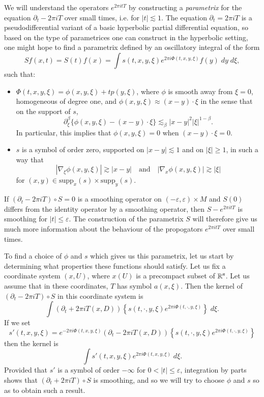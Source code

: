 We will understand the operators $e^{2 \pi i t T}$ by constructing a \emph{parametrix} for the equation $\partial_t - 2 \pi i T$ over small times, i.e. for $|t| \lesssim 1$. The equation $\partial_t = 2 \pi i T$ is a pseudodifferential variant of a basic hyperbolic partial differential equation, so based on the type of parametrices one can construct in the hyperbolic setting, one might hope to find a parametrix defined by an oscillatory integral of the form
%
\[ Sf(x,t) = S(t)f(x) = \int s(t,x,y,\xi) e^{2 \pi i \Phi(t,x,y,\xi)} f(y)\; dy\; d\xi, \]
%
such that:
%
\begin{itemize}
    \item $\Phi(t,x,y,\xi) = \phi(x,y,\xi) + t p(y,\xi)$, where $\phi$ is smooth away from $\xi = 0$, homogeneous of degree one, and $\phi(x,y,\xi) \approx (x - y) \cdot \xi$ in the sense that on the support of $s$,
    \[ \partial^\beta_\xi \{ \phi(x,y,\xi) - (x - y) \cdot \xi \} \lesssim_\beta |x - y|^2 |\xi|^{1 - \beta}. \]
    In particular, this implies that $\phi(x,y,\xi) = 0$ when $(x - y) \cdot \xi = 0$.

    \item $s$ is a symbol of order zero, supported on $|x - y| \lesssim 1$ and on $|\xi| \geq 1$, in such a way that
    \[ |\nabla_\xi \phi(x,y,\xi)| \gtrsim |x - y| \quad\text{and}\quad |\nabla_x \phi(x,y,\xi)| \gtrsim |\xi| \]
    for $(x,y) \in \text{supp}_x(s) \times \text{supp}_y(s)$.
\end{itemize}
%
If $(\partial_t - 2 \pi i T) \circ S = 0$ is a smoothing operator on $(-\varepsilon,\varepsilon) \times M$ and $S(0)$ differs from the identity operator by a smoothing operator, then $S - e^{2 \pi i t T}$ is smoothing for $|t| \leq \varepsilon$. The construction of the parametrix $S$ will therefore give us much more information about the behaviour of the propogators $e^{2 \pi i t T}$ over small times.

To find a choice of $\phi$ and $s$ which gives us this parametrix, let us start by determining what properties these functions should satisfy. Let us fix a coordinate system $(x,U)$, where $x(U)$ is a precompact subset of $\operatorname{\mathbb{R}}^n$. Let us assume that in these coordinates, $T$ has symbol $a(x,\xi)$. Then the kernel of $(\partial_t - 2 \pi i T) \circ S$ in this coordinate system is
%
\[ \int (\partial_t + 2 \pi i T(x,D)) \left\{ s(t,\cdot,y,\xi) e^{2 \pi i \Phi(t,\cdot,y,\xi)} \right\}\; d\xi. \]
%
If we set
%
\[ s'(t,x,y,\xi) = e^{- 2 \pi i \Phi(t,x,y,\xi)} (\partial_t - 2 \pi i T(x,D)) \left\{ s(t,\cdot,y,\xi) e^{2 \pi i \Phi(t,\cdot,y,\xi)} \right\} \]
%
then the kernel is
%
\[ \int s'(t,x,y,\xi) e^{2 \pi i \Phi(t,x,y,\xi)}\; d\xi. \]
%
Provided that $s'$ is a symbol of order $-\infty$ for $0 < |t| \leq \varepsilon$, integration by parts shows that $(\partial_t + 2 \pi i T) \circ S$ is smoothing, and so we will try to choose $\phi$ and $s$ so as to obtain such a result.

